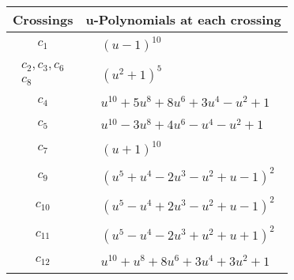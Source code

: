\documentclass[1p]{elsarticle_modified}
\theoremstyle{definition}
\begin{document}
\begin{tabular}{m{50pt}|m{274pt}}
Crossings & \hspace{64pt}u-Polynomials at each crossing \\
\hline $$\begin{aligned}c_{1}\end{aligned}$$&$\begin{aligned}
&(u-1)^{10}
\end{aligned}$\\
\hline $$\begin{aligned}c_{2},c_{3},c_{6}\\c_{8}\end{aligned}$$&$\begin{aligned}
&(u^2+1)^5
\end{aligned}$\\
\hline $$\begin{aligned}c_{4}\end{aligned}$$&$\begin{aligned}
&u^{10}+5 u^8+8 u^6+3 u^4- u^2+1
\end{aligned}$\\
\hline $$\begin{aligned}c_{5}\end{aligned}$$&$\begin{aligned}
&u^{10}-3 u^8+4 u^6- u^4- u^2+1
\end{aligned}$\\
\hline $$\begin{aligned}c_{7}\end{aligned}$$&$\begin{aligned}
&(u+1)^{10}
\end{aligned}$\\
\hline $$\begin{aligned}c_{9}\end{aligned}$$&$\begin{aligned}
&(u^5+u^4-2 u^3- u^2+u-1)^2
\end{aligned}$\\
\hline $$\begin{aligned}c_{10}\end{aligned}$$&$\begin{aligned}
&(u^5- u^4+2 u^3- u^2+u-1)^2
\end{aligned}$\\
\hline $$\begin{aligned}c_{11}\end{aligned}$$&$\begin{aligned}
&(u^5- u^4-2 u^3+u^2+u+1)^2
\end{aligned}$\\
\hline $$\begin{aligned}c_{12}\end{aligned}$$&$\begin{aligned}
&u^{10}+u^8+8 u^6+3 u^4+3 u^2+1
\end{aligned}$\\
\hline
\end{tabular}\\~\\
\end{document}
